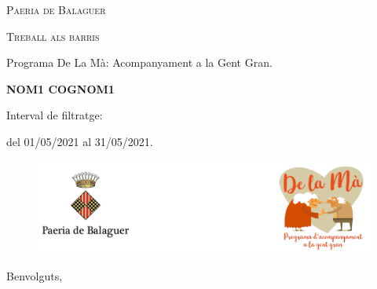 \documentclass[a4paper,12pt]{elsarticle}  %
\begin{document}
 	


\begin{titlepage}
	\centering

	{\scshape\LARGE Paeria de Balaguer \par}


			\vfill


	{\scshape\Large Treball als barris\par}

	
			\vspace{0.5cm}

	
	{\Large Programa De La Mà: Acompanyament a la Gent Gran.\par}

			

			\vfill



	{\Large\bfseries NOM1 COGNOM1 \par}
	


			\vfill



	{\large Interval de filtratge:\par}
	{\large del 01/05/2021 al 31/05/2021.\par}
		

\end{titlepage}



\clearpage







\FloatBarrier
\begin{figure}[h]
	\centering	
	\includegraphics[width=1\textwidth]{../IMATGES/logoPaeriaMa.png}
\end{figure}
\FloatBarrier	

\vfill









\noindent Benvolguts,

	\vspace{0.5cm}
\end{document}
